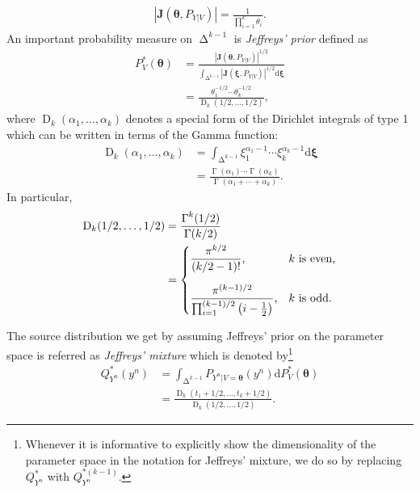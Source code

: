 \documentclass[journal, 10pt]{IEEEtran}
\def\ds{\displaystyle}
\newcommand{\bfJ}{\mathbf{J}}
\newcommand{\rmd}{\mathrm{d}}
\theoremstyle{plain}
\theoremstyle{plain}
\theoremstyle{plain}
\theoremstyle{plain}
\newcommand{\boldtheta}{\mathbold{\theta}}
\newcommand{\boldxi}{\mathbold{\xi}}
\newcommand{\opD}{\operatorname{D}}
\newcommand{\opGamma}{\operatorname{\Gamma}}
\newcommand{\simplex}{\operatorname{\Delta}}
\begin{document}
\begin{align}
	|\bfJ(\boldtheta, P_{Y|V})|=\frac{1}{\prod_{i=1}^{k} \theta_i }\text{.}
\end{align}
An important probability measure on $\simplex^{k-1} $ is \emph{Jeffreys' prior} \cite{Jeffreys46} defined as
\begin{align}
	P_{V}^\ast(\boldtheta)&=\frac{|\bfJ(\boldtheta, P_{Y|V})|^{1/2}}{\ds \int_{\simplex^{k-1} } |\bfJ(\boldxi, P_{Y|V})|^{1/2} \rmd \boldxi}\\
		&=\frac{\theta_1^{-1/2} \cdots \theta_k^{-1/2} }{\opD_k(1/2, \hdots, 1/2)} \text{,} \label{eqn:defn:jeffreys prior}
\end{align}
where $\opD_k(\alpha_1, \hdots, \alpha_k)$ denotes a special form of the Dirichlet integrals of type 1 which can be written in terms of the Gamma function:
\begin{align}
	\opD_k(\alpha_1, \hdots, \alpha_k)&= \int_{\simplex^{k-1} } \xi_1^{\alpha_1-1 } \cdots \xi_k^{\alpha_k-1 } \rmd \boldxi \\
		&= \frac{\opGamma(\alpha_1) \cdots \opGamma(\alpha_k ) }{\opGamma(\alpha_1+\cdots+\alpha_k ) }\text{.} \label{eqn:def:dirichlet integrals}
\end{align}
In particular,
\begin{align}
	\opD_k(1/2, \hdots, 1/2) &= \frac{\opGamma^k(1/2)}{\opGamma(k/2)} \\
	&= \begin{cases}
		\ds\frac{\pi^{k/2}}{(k/2-1)!}\text{,} & k \text{ is even,} \vspace{1em} \\
		\ds\frac{\pi^{(k-1)/2}}{\prod_{i=1}^{(k-1)/2}\left(i-\frac12\right)}\text{,} & k \text{ is odd.}
	\end{cases}
\end{align}

The source distribution we get by assuming Jeffreys' prior on the parameter space is referred as \emph{Jeffreys' mixture} which is denoted by\footnote{Whenever it is informative to explicitly show the dimensionality of the parameter space in the notation for Jeffreys' mixture, we do so by replacing $Q^\ast_{Y^n}$ with $Q^{\ast(k-1)}_{Y^n}$.}
\begin{align}
	Q^\ast_{Y^n}(y^n)&=\int_{\simplex^{k-1} } P_{Y^n|V=\boldtheta}(y^n)\rmd P_{V}^\ast(\boldtheta) \label{eqn:def:jeffreys mixture} \\
	&= \frac{\opD_k(t_1+1/2, \hdots, t_k+1/2 ) }{\opD_k(1/2, \hdots, 1/2)} \text{.}
\end{align}
\end{document}
